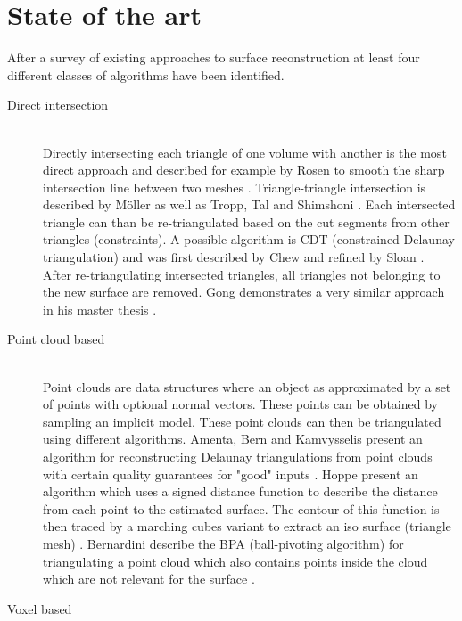 
\section{State of the art}

After a survey of existing approaches to surface reconstruction at least four different classes of algorithms have been identified.

\begin{description}
	
\item[Direct intersection] \hfill \\
Directly intersecting each triangle of one volume with another is the most direct approach and described for example by Rosen to smooth the sharp intersection line between two meshes \cite{mesh_intersection}. Triangle-triangle intersection is described by M\"oller \cite{tri_tri_intersection_moller} as well as Tropp, Tal and Shimshoni \cite{tri_tri_intersection_2}. Each intersected triangle can than be re-triangulated based on the cut segments from other triangles (constraints). A possible algorithm is CDT (constrained Delaunay triangulation) and was first described by Chew \cite{CDT} and refined by Sloan \cite{CDT_fast}. After re-triangulating intersected triangles, all triangles not belonging to the new surface are removed. Gong demonstrates a very similar approach in his master thesis \cite{cutter_workpiece_engagement}.

\item[Point cloud based] \hfill \\
Point clouds are data structures where an object as approximated by a set of points with optional normal vectors. These points can be obtained \eg by sampling an implicit model. These point clouds can then be triangulated using different algorithms. 
Amenta, Bern and Kamvysselis present an algorithm for reconstructing Delaunay triangulations from point clouds with certain quality guarantees for "good" inputs \cite{vornoi_surface_reconstruction}.
Hoppe \etal present an algorithm which uses a signed distance function to describe the distance from each point to the estimated surface. The contour of this function is then traced by a marching cubes variant to extract an iso surface (triangle mesh) \cite{surface_reconstruction}.
Bernardini \etal describe the BPA (ball-pivoting algorithm) for triangulating a point cloud which also contains points inside the cloud which are not relevant for the surface \cite{BPA}.


\item[Voxel based] \hfill \\


\end{description}
